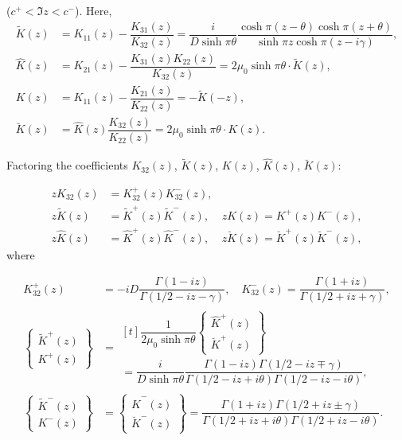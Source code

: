 ($c^{+} <\Im z<c^{-} $). Here,
\begin{equation} \label{Ostryk_Eq_19_} 
\begin{aligned}
	\tilde{K}(z)&=K_{11} (z)-\dfrac{K_{31} (z)}{K_{32} (z)} =\dfrac{i}{D\sinh \pi \theta } \dfrac{\cosh \pi (z-\theta )\cosh \pi (z+\theta )}{\sinh \pi z\cosh \pi (z-i\gamma )} ,
	\\
	\hat{K}(z)&=K_{21} (z)-\dfrac{K_{31} (z)K_{22} (z)}{K_{32} (z)} =2\mu _{0} \sinh \pi \theta \cdot \tilde{K}(z),  
	\\
	K(z)&=K_{11} (z)-\dfrac{K_{21} (z)}{K_{22} (z)} =-\tilde{K}(-z),  
	\\
	\breve{K}(z)&=\hat{K}(z)\dfrac{K_{32} (z)}{K_{22} (z)} =2\mu _{0} \sinh \pi \theta \cdot K(z).
\end{aligned}
\end{equation} 

Factoring the coefficients $K_{32} (z)$, $\tilde{K}(z)$, $K(z)$, $\hat{K}(z)$, $\breve{K}(z)$:

\begin{equation} \label{Ostryk_Eq_20_} 
\begin{aligned}
	zK_{32} (z)&=K_{32}^{+} (z)K_{32}^{-} (z),  &
	\\
	z\tilde{K}(z)&=\tilde{K}^{+} (z)\tilde{K}^{-}
	(z), &	zK(z)=K^{+} (z)K^{-} (z), 
	\\
	z\hat{K}(z)&=\hat{K}^{+} (z)\hat{K}^{-} (z), &    
	z\breve{K}(z)=\breve{K}^{+} (z)\breve{K}^{-} (z),
\end{aligned}
\end{equation}
where

\[
\begin{aligned}
K_{32}^{+} (z) &= -iD\dfrac{\Gamma (1-iz)}{\Gamma (1/2 -iz-\gamma )} ,\quad    K_{32}^{-} (z)=\dfrac{\Gamma (1+iz)}{\Gamma (1/2 +iz+\gamma )} ,
\\
\left\{\begin{array}{l} {\tilde{K}^{+} (z)} \\ {K^{+} (z)} \end{array}\right\}&=
\begin{multlined}[t]
	\dfrac{1}{2\mu _{0} \sinh \pi \theta } \left\{\begin{array}{l} {\hat{K}^{+} (z)} \\ {\breve{K}^{+} (z)} \end{array}\right\}
	\\
	=\dfrac{i}{D\sinh \pi \theta } \dfrac{\Gamma (1-iz)\Gamma (1/2 -iz\mp \gamma )}{\Gamma (1/2 -iz+i\theta )\Gamma (1/2 -iz-i\theta )} , 
\end{multlined}
\\
\left\{\begin{array}{l} {\tilde{K}^{-} (z)} \\ {K^{-} (z)} \end{array}\right\}&=\left\{\begin{array}{l} {\hat{K}^{-} (z)} \\ {\breve{K}^{-} (z)} \end{array}\right\}=\dfrac{\Gamma (1+iz)\Gamma (1/2 +iz\pm \gamma )}{\Gamma (1/2 +iz+i\theta )\Gamma (1/2 +iz-i\theta )} . 
\end{aligned} 
\] 

